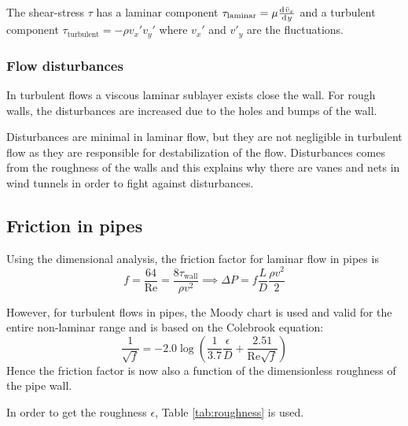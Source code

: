 \documentclass[10pt, twocolumn]{article}
\begin{document}
The shear-stress \(\tau\) has a laminar component \(\tau_\mathrm{laminar} = \mu \frac{\mathrm{d}^{} \bar{v}_x}{\mathrm{d}^{} y}\) and a turbulent component \(\tau_\mathrm{turbulent} = - \rho v_x'v_y'\) where \(v_x'\) and \(v'_y\) are the fluctuations.


\subsubsection{Flow disturbances}
In turbulent flows a viscous laminar sublayer exists close the wall.
For rough walls, the disturbances are increased due to the holes and bumps of the wall.

Disturbances are minimal in laminar flow, but they are not negligible in turbulent flow as they are responsible for destabilization of the flow.
Disturbances comes from the roughness of the walls and this explains why there are vanes and nets in wind tunnels in order to fight against disturbances.


\subsection{Friction in pipes}
Using the dimensional analysis, the friction factor for laminar flow in pipes is
\[
  f = \frac{64}{\mathrm{Re}} = \frac{8\tau_\mathrm{wall}}{\rho v^2} \implies \Delta P = f \frac{L}{D} \frac{\rho v^2}{2}
\]

However, for turbulent flows in pipes, the Moody chart is used and valid for the entire non-laminar range and is based on the Colebrook equation:
\[
  \frac{1}{\sqrt{f}} = -2.0 \log\left( \frac{1}{3.7} \frac{\epsilon}{D} + \frac{2.51}{\mathrm{Re}\sqrt{f}} \right)
\]
Hence the friction factor is now also a function of the dimensionless roughness of the pipe wall.

In order to get the roughness \(\epsilon\), Table \ref{tab:roughness} is used.
\end{document}
